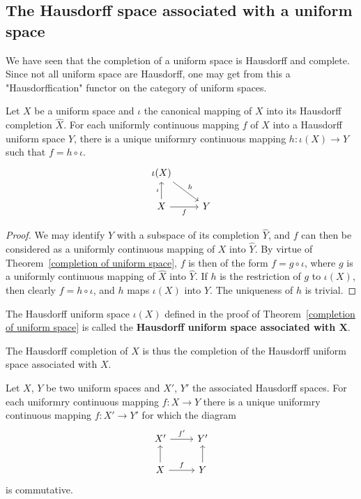 \subsection{The Hausdorff space associated with a uniform space}
We have seen that the completion of a uniform space is Hausdorff and complete. Since not all uniform space are Hausdorff, one may get from this a "Hausdorffication" functor on the category of uniform spaces.
\begin{proposition}\label{uniform space Hausdorffication prop}
Let $X$ be a uniform space and $\iota$ the canonical mapping of $X$ into its Hausdorff completion $\widehat{X}$. For each uniformly continuous mapping $f$ of $X$ into a Hausdorff uniform space $Y$, there is a unique uniformry continuous mapping $h:\iota(X)\to Y$ such that $f=h\circ\iota$.
\[\begin{tikzcd}
\iota(X)\ar[rd,"h"]&\\
X\ar[u,"\iota"]\ar[r,swap,"f"]&Y
\end{tikzcd}\]
\end{proposition}
\begin{proof}
We may identify $Y$ with a subspace of its completion $\widehat{Y}$, and $f$ can then be considered as a uniformly continuous mapping of $X$ into $\widehat{Y}$. By virtue of Theorem~\ref{completion of uniform space}, $f$ is then of the form $f=g\circ\iota$, where $g$ is a uniformly continuous mapping of $\widehat{X}$ into $\widehat{Y}$. If $h$ is the restriction of $g$ to $\iota(X)$, then clearly $f=h\circ\iota$, and $h$ maps $\iota(X)$ into $Y$. The uniqueness of $h$ is trivial.
\end{proof}
\begin{definition}
The Hausdorff uniform space $\iota(X)$ defined in the proof of Theorem~\ref{completion of uniform space} is called the \textbf{Hausdorff uniform space associated with $\bm{X}$}.
\end{definition}
The Hausdorff completion of $X$ is thus the completion of the Hausdorff uniform space associated with $X$.
\begin{corollary}
Let $X$, $Y$ be two uniform spaces and $X'$, $Y'$ the associated Hausdorff spaces. For each uniformry continuous mapping $f:X\to Y$ there is a unique uniformry continuous mapping $f:X'\to Y'$ for which the diagram
\[\begin{tikzcd}
X'\ar[r,"f'"]&Y'\\
X\ar[u]\ar[r,"f"]&Y\ar[u]
\end{tikzcd}\]
is commutative.
\end{corollary}
